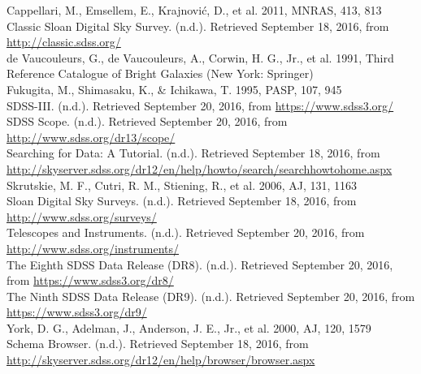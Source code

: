 \documentclass[10pt,letterpaper]{article}
\begin{document}
\newpage
\center
\begin{thebibliography}{1}
 Cappellari, M., Emsellem, E., Krajnovi\'c, D., et al. 2011, MNRAS, 413, 813\\

 Classic Sloan Digital Sky Survey. (n.d.). Retrieved September 18, 2016, from \url{http://classic.sdss.org/}\\

 de Vaucouleurs, G., de Vaucouleurs, A., Corwin, H. G., Jr., et al. 1991, Third
Reference Catalogue of Bright Galaxies (New York: Springer)\\

 Fukugita, M., Shimasaku, K., \& Ichikawa, T. 1995, PASP, 107, 945\\

 SDSS-III. (n.d.). Retrieved September 20, 2016, from \url{https://www.sdss3.org/}\\

 SDSS Scope. (n.d.). Retrieved September 20, 2016, from \url{http://www.sdss.org/dr13/scope/}\\

 Searching for Data: A Tutorial. (n.d.). Retrieved September 18, 2016, from \url{http://skyserver.sdss.org/dr12/en/help/howto/search/searchhowtohome.aspx}\\

 Skrutskie, M. F., Cutri, R. M., Stiening, R., et al. 2006, AJ, 131, 1163\\

 Sloan Digital Sky Surveys. (n.d.). Retrieved September 18, 2016, from \url{http://www.sdss.org/surveys/}\\

 Telescopes and Instruments. (n.d.). Retrieved September 20, 2016, from \url{http://www.sdss.org/instruments/}\\

 The Eighth SDSS Data Release (DR8). (n.d.). Retrieved September 20, 2016, from \url{https://www.sdss3.org/dr8/}\\

 The Ninth SDSS Data Release (DR9). (n.d.). Retrieved September 20, 2016, from \url{https://www.sdss3.org/dr9/}\\

 York, D. G., Adelman, J., Anderson, J. E., Jr., et al. 2000, AJ, 120, 1579\\

 Schema Browser. (n.d.). Retrieved September 18, 2016, from \url{http://skyserver.sdss.org/dr12/en/help/browser/browser.aspx}\\

\end{thebibliography}
\end{document}
